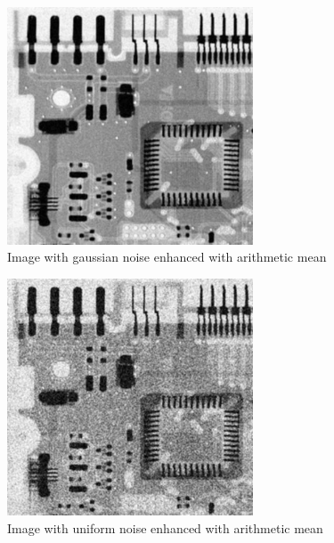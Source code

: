 \documentclass[10pt]{article}
\begin{document}
\begin{figure}[!ht]
	\centering
	\includegraphics[height=200pt]{./ex4/gaussarith.jpg}
	\caption{Image with gaussian noise enhanced with arithmetic mean}
\end{figure}
\begin{figure}[!ht]
	\centering
	\includegraphics[height=200pt]{./ex4/uniarith.jpg}
	\caption{Image with uniform noise enhanced with arithmetic mean}
\end{figure}
\end{document}
